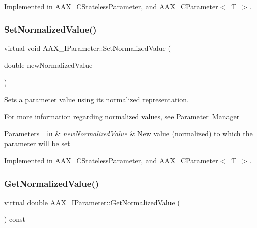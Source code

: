 Implemented in \mbox{\hyperlink{a01541_a815f21974e1a75eb9fdcc5cf3e0704c4}{A\+A\+X\+\_\+\+C\+Stateless\+Parameter}}, and \mbox{\hyperlink{a01537_a52d73a61f7b7cdc7125e76617883f3fd}{A\+A\+X\+\_\+\+C\+Parameter$<$ T $>$}}.

\mbox{\label{a01857_ad4b9a53e4e972d1a840ef094036e5a70}} 
\subsubsection{\texorpdfstring{SetNormalizedValue()}{SetNormalizedValue()}}
{\footnotesize\ttfamily virtual void A\+A\+X\+\_\+\+I\+Parameter\+::\+Set\+Normalized\+Value (\begin{DoxyParamCaption}\item[{double}]{new\+Normalized\+Value }\end{DoxyParamCaption})\hspace{0.3cm}{\ttfamily [pure virtual]}}



Sets a parameter value using it\textquotesingle{}s normalized representation. 

For more information regarding normalized values, see \mbox{\hyperlink{a00814}{Parameter Manager}}


\begin{DoxyParams}[1]{Parameters}
\mbox{\texttt{ in}}  & {\em new\+Normalized\+Value} & New value (normalized) to which the parameter will be set \\
\hline
\end{DoxyParams}


Implemented in \mbox{\hyperlink{a01541_a921a21bd3a68cdcf6c9d5903f3d18dd6}{A\+A\+X\+\_\+\+C\+Stateless\+Parameter}}, and \mbox{\hyperlink{a01537_ac4f8ae8c5ecb2cd04ebc3aa2523449f7}{A\+A\+X\+\_\+\+C\+Parameter$<$ T $>$}}.

\mbox{\label{a01857_a32bc181c17b36fc52736d4d816c56907}} 
\subsubsection{\texorpdfstring{GetNormalizedValue()}{GetNormalizedValue()}}
{\footnotesize\ttfamily virtual double A\+A\+X\+\_\+\+I\+Parameter\+::\+Get\+Normalized\+Value (\begin{DoxyParamCaption}{ }\end{DoxyParamCaption}) const\hspace{0.3cm}{\ttfamily [pure virtual]}}



